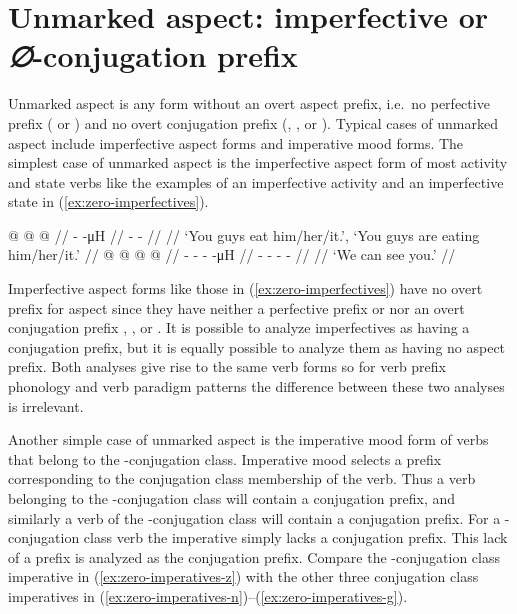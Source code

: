 \clearpage
\section{Unmarked aspect: imperfective or \textit{∅}-conjugation prefix}\label{sec:zero}

\begin{multicols}{2}
\noindent
Unmarked aspect is any form without an overt aspect prefix, i.e.\ no perfective prefix ( or ) and no overt conjugation prefix (, , or ).
Typical cases of unmarked aspect include imperfective aspect forms and imperative mood forms.
The simplest case of unmarked aspect is the imperfective aspect form of most activity and state verbs like the examples of an imperfective activity and an imperfective state in (\ref{ex:zero-imperfectives}).

\pex\label{ex:zero-imperfectives}%
\a\label{ex:zero-imperfectives-activity}%
%
\begingl
	\gla	{} @ {} @ {} @ {} //
	\glb	{} -  -μH //
	\glc	{} -  - //
	\gld	{} {} {} {} //
	\glft	‘You guys eat him/her/it.’, ‘You guys are eating him/her/it.’
		//
\endgl
\a\label{ex:zero-imperfectives-state}%
%
\begingl
	\gla	{} @ {} @ {} @ {} @ {} //
	\glb	{}- - -  -μH //
	\glc	{}- - -  - //
	\gld	{} {} {} {} {} {} //
	\glft	‘We can see you.’
		//
\endgl
\xe

Imperfective aspect forms like those in (\ref{ex:zero-imperfectives}) have no overt prefix for aspect since they have neither a perfective prefix  or  nor an overt conjugation prefix , , or .
It is possible to analyze imperfectives as having a  conjugation prefix, but it is equally possible to analyze them as having no aspect prefix.
Both analyses give rise to the same verb forms so for verb prefix phonology and verb paradigm patterns the difference between these two analyses is irrelevant.

Another simple case of unmarked aspect is the imperative mood form of verbs that belong to the -conjugation class.
Imperative mood selects a prefix corresponding to the conjugation class membership of the verb.
Thus a verb belonging to the -conjugation class will contain a  conjugation prefix, and similarly a verb of the -conjugation class will contain a  conjugation prefix.
For a -conjugation class verb the imperative simply lacks a conjugation prefix.
This lack of a prefix is analyzed as the  conjugation prefix.
Compare the -conjugation class imperative in (\ref{ex:zero-imperatives-z}) with the other three conjugation class imperatives in (\ref{ex:zero-imperatives-n})–(\ref{ex:zero-imperatives-g}).


\end{multicols}
